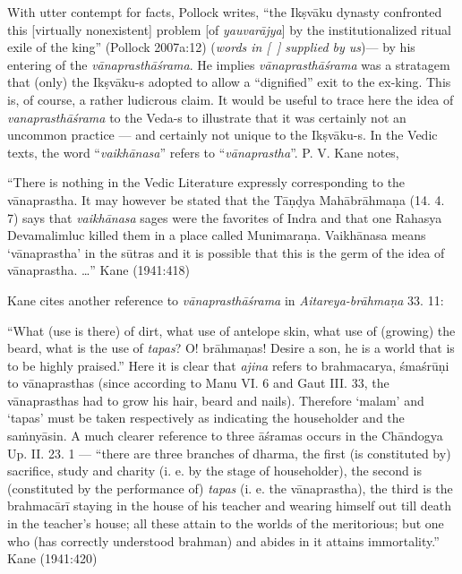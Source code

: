 With utter contempt for facts, Pollock writes, “the Ikṣvāku dynasty confronted this [virtually nonexistent] problem [of {\sl yauvarājya}] by the institutionalized ritual exile of the king” (Pollock 2007a:12) ({\sl words in [~] supplied by us})--- by his entering of the {\sl vānaprasthāśrama}. He implies {\sl vānaprasthāśrama} was a stratagem that (only) the  Ikṣvāku-s adopted to allow a “dignified” exit to the ex-king. This is, of course, a rather ludicrous claim. It would be useful to trace here the idea of {\sl vanaprasthāśrama} to the \hbox{Veda-s} to illustrate that it was certainly not an uncommon practice --- and certainly not unique to the Ikṣvāku-s. In the Vedic texts, the word “{\sl vaikhānasa}” refers to “{\sl vānaprastha}”. P. V. Kane notes, 

\begin{myquote}
{{“There is nothing in the Vedic Literature expressly corresponding to the vānaprastha. It may however be stated that the Tāṇḍya Mahābrāhmaṇa (14. 4. 7) says that {\sl vaikhānasa} sages were the favorites of Indra and that one Rahasya Devamalimluc killed them in a place called Munimaraṇa. Vaikhānasa means ‘vānaprastha’ in the sūtras and it is possible that this is the germ of the idea of vānaprastha. …”}}
\hfill  Kane (1941:418)
\end{myquote}

Kane cites another reference to {\sl vānaprasthāśrama} in {\sl Aitareya-brāhmaṇa}
 33. 11:

\begin{myquote}
“What (use is there) of dirt, what use of antelope skin, what use of (growing) the beard, what is the use of {\sl tapas}? O! brāhmaṇas! Desire a son, he is a world that is to be highly praised.” Here it is clear that {\sl ajina} refers to brahmacarya, śmaśrūṇi to vānaprasthas (since according to Manu VI. 6 and Gaut III. 33, the vānaprasthas had to grow his hair, beard and nails). Therefore `malam’ and `tapas' must be taken respectively as indicating the householder and the saṁnyāsin. A much clearer reference to three āśramas occurs in the Chāndogya Up. II. 23. 1 --- “there are three branches of dharma, the first (is constituted by) sacrifice, study and charity (i. e. by the stage of householder), the second is (constituted by the performance of) {\sl tapas} (i. e. the vānaprastha), the third is the brahmacārī staying in the house of his teacher and wearing himself out till death in the teacher's house; all these attain to the worlds of the meritorious; but one who (has correctly understood brahman) and abides in it attains immortality.”
\hfill Kane (1941:420)
\end{myquote}

